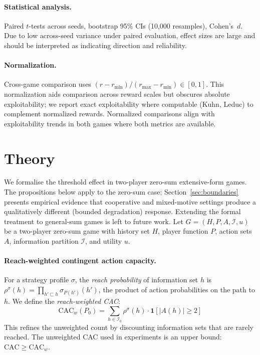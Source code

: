 \documentclass{article}
\begin{document}
\paragraph{Statistical analysis.}
Paired $t$-tests across seeds, bootstrap 95\% CIs (10{,}000 resamples), Cohen's~$d$. Due to low across-seed variance under paired evaluation, effect sizes are large and should be interpreted as indicating direction and reliability.

\paragraph{Normalization.}
Cross-game comparison uses $(r - r_{\min}) / (r_{\max} - r_{\min}) \in [0,1]$. This normalization aids comparison across reward scales but obscures absolute exploitability; we report exact exploitability where computable (Kuhn, Leduc) to complement normalized rewards. Normalized comparisons align with exploitability trends in both games where both metrics are available.

\section{Theory}

We formalise the threshold effect in two-player zero-sum extensive-form games. The propositions below apply to the zero-sum case; Section~\ref{sec:boundaries} presents empirical evidence that cooperative and mixed-motive settings produce a qualitatively different (bounded degradation) response. Extending the formal treatment to general-sum games is left to future work. Let $G = (H, P, A, \mathcal{I}, u)$ be a two-player zero-sum game with history set $H$, player function $P$, action sets $A$, information partition $\mathcal{I}$, and utility $u$.

\paragraph{Reach-weighted contingent action capacity.}
For a strategy profile $\sigma$, the \emph{reach probability} of information set $h$ is $\rho^\sigma(h) = \prod_{h' \sqsubset h} \sigma_{P(h')}(h')$, the product of action probabilities on the path to $h$. We define the \emph{reach-weighted CAC}:
\begin{equation}
\text{CAC}_w(P_0) = \sum_{h \in \mathcal{I}_0} \rho^{\sigma}(h) \cdot \mathbf{1}[|A(h)| \geq 2]
\label{eq:cac-w}
\end{equation}
This refines the unweighted count by discounting information sets that are rarely reached. The unweighted CAC used in experiments is an upper bound: $\text{CAC} \geq \text{CAC}_w$.
\end{document}
